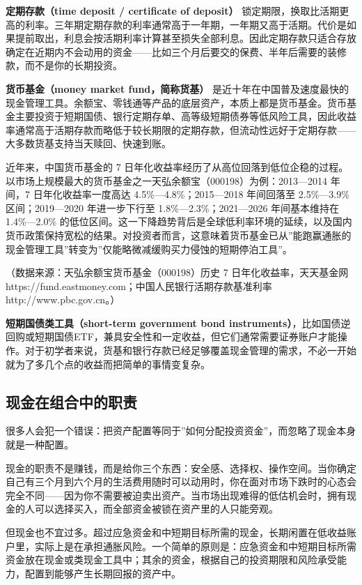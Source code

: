 \documentclass[a4paper,11pt,oneside,fontset=none,UTF8,zihao=-4]{ctexbook}
\begin{document}
\textbf{定期存款（time deposit / certificate of deposit）}
锁定期限，换取比活期更高的利率。三年期定期存款的利率通常高于一年期，一年期又高于活期。代价是如果提前取出，利息会按活期利率计算甚至损失全部利息。因此定期存款只适合存放确定在近期内不会动用的资金------比如三个月后要交的保费、半年后需要的装修款，而不是你的长期投资。

\textbf{货币基金（money market fund，简称货基）}
是近十年在中国普及速度最快的现金管理工具。余额宝、零钱通等产品的底层资产，本质上都是货币基金。货币基金主要投资于短期国债、银行定期存单、高等级短期债券等低风险工具，因此收益率通常高于活期存款而略低于较长期限的定期存款，但流动性远好于定期存款------大多数货基支持当天赎回、快速到账。

近年来，中国货币基金的 7
日年化收益率经历了从高位回落到低位企稳的过程。以市场上规模最大的货币基金之一天弘余额宝（000198）为例：2013---2014
年间，7 日年化收益率一度高达 4.5\%---4.8\%；2015---2018 年间回落至
2.5\%---3.9\% 区间；2019---2020 年进一步下行至
1.8\%---2.3\%；2021---2026 年间基本维持在 1.4\%---2.0\%
的低位区间。这一下降趋势背后是全球低利率环境的延续，以及国内货币政策保持宽松的结果。对投资者而言，这意味着货币基金已从''能跑赢通胀的现金管理工具''转变为''仅能略微减缓购买力侵蚀的短期停泊工具''。

（数据来源：天弘余额宝货币基金（000198）历史 7 日年化收益率，天天基金网
https://fund.eastmoney.com；中国人民银行活期存款基准利率
http://www.pbc.gov.cn。）

\textbf{短期国债类工具（short-term government bond
instruments）}，比如国债逆回购或短期国债ETF，兼具安全性和一定收益，但它们通常需要证券账户才能操作。对于初学者来说，货基和银行存款已经足够覆盖现金管理的需求，不必一开始就为了多几个点的收益而把简单的事情变复杂。

\subsection{现金在组合中的职责}\label{ux73b0ux91d1ux5728ux7ec4ux5408ux4e2dux7684ux804cux8d23}

很多人会犯一个错误：把资产配置等同于''如何分配投资资金''，而忽略了现金本身就是一种配置。

现金的职责不是赚钱，而是给你三个东西：安全感、选择权、操作空间。当你确定自己有三个月到六个月的生活费用随时可以动用时，你在面对市场下跌时的心态会完全不同------因为你不需要被迫卖出资产。当市场出现难得的低估机会时，拥有现金的人可以选择买入，而全部资金被锁在资产里的人只能旁观。

但现金也不宜过多。超过应急资金和中短期目标所需的现金，长期闲置在低收益账户里，实际上是在承担通胀风险。一个简单的原则是：应急资金和中短期目标所需资金放在现金或类现金工具中；其余的资金，根据自己的投资期限和风险承受能力，配置到能够产生长期回报的资产中。
\end{document}
